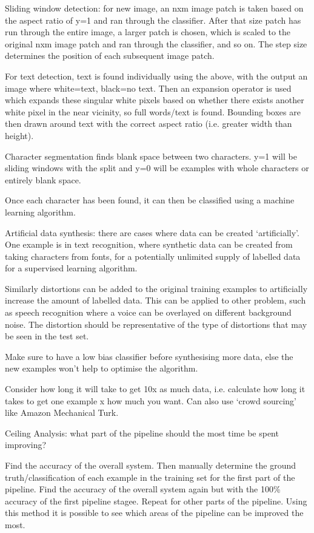 \documentclass[12pt] {article}
\begin{document}
{  Sliding window detection: for new image, an nxm image patch is taken based on
  the aspect ratio of y=1 and ran through the classifier. After that size patch 
  has run through the entire image, a larger patch is chosen, which is scaled 
  to the original nxm image patch and ran through the classifier, and so on. 
  The step size determines the position of each subsequent image patch. 

  For text detection, text is found individually using the above, with the 
  output an image where white=text, black=no text. Then an expansion 
  operator is used which expands these singular white pixels based on whether
  there exists another white pixel in the near vicinity, so full words/text
  is found. Bounding boxes are then drawn around text with the correct aspect
  ratio (i.e. greater width than height). 

  Character segmentation finds blank space between two characters. y=1 will be
  sliding windows with the split and y=0 will be examples with whole characters
  or entirely blank space. 

  Once each character has been found, it can then be classified using a machine
  learning algorithm. 

  Artificial data synthesis: there are cases where data can be created 
  `artificially'. One example is in text recognition, where synthetic data can
  be created from taking characters from fonts, for a potentially unlimited 
  supply of labelled data for a supervised learning algorithm. 
  
  Similarly distortions can be added to the original training examples to 
  artificially increase the amount of labelled data. This can be applied to
  other problem, such as speech recognition where a voice can be overlayed
  on different background noise. The distortion should be representative of
  the type of distortions that may be seen in the test set. 

  Make sure to have a low bias classifier before synthesising more data, else
  the new examples won't help to optimise the algorithm.

  Consider how long it will take to get 10x as much data, i.e. calculate how
  long it takes to get one example x how much you want. Can also use `crowd
  sourcing' like Amazon Mechanical Turk. 

  Ceiling Analysis: what part of the pipeline should the most time be spent
  improving? 

  Find the accuracy of the overall system. Then manually determine the ground
  truth/classification of each example in the training set for the first part 
  of the pipeline. Find the accuracy of the overall system again but with the 
  100\% accuracy of the first pipeline stagee. Repeat for other parts of the
  pipeline. Using this method it is possible to see which areas of the pipeline
  can be improved the most. 

}
\end{document}
